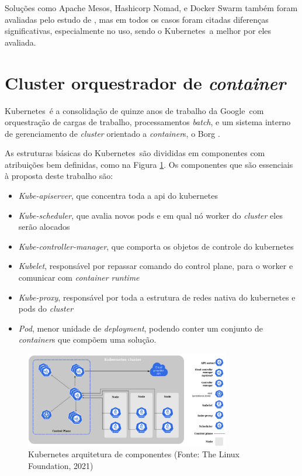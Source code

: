Soluções como Apache Mesos, Hashicorp Nomad, e Docker Swarm também foram avaliadas pelo estudo de \cite{truyen_comprehensive_2021}, mas em todos os casos foram citadas diferenças significativas, especialmente no uso, sendo o Kubernetes\textregistered \ a melhor por eles avaliada. 

\section{Cluster orquestrador de \emph{container}}

Kubernetes\textregistered \ é a consolidação de quinze anos de trabalho da Google\textregistered \ com orquestração de cargas de trabalho, processamentos \emph{batch}, e um sistema interno de gerenciamento de \emph{cluster} orientado a \emph{container}s, o Borg \cite{verma_large-scale_2015}. 

As estruturas básicas do Kubernetes\textregistered \ são divididas em componentes com atribuições bem definidas, como na Figura \ref{fig:kubenode}. Os componentes que são essenciais à proposta deste trabalho são:
\begin{itemize}
    \item \emph{Kube-apiserver}, que concentra toda a api do kubernetes
    \item \emph{Kube-scheduler}, que avalia novos pods e em qual nó worker do \emph{cluster} eles serão alocados
    \item \emph{Kube-controller-manager}, que comporta os objetos de controle do kubernetes
    \item \emph{Kubelet}, responsável por repassar comando do control plane, para o worker e comunicar com \emph{container} \emph{runtime}
    \item \emph{Kube-proxy}, responsável por toda a estrutura de redes nativa do kubernetes e pods do \emph{cluster}
    \item \emph{Pod}, menor unidade de \emph{deployment}, podendo conter um conjunto de \emph{container}s que compõem uma solução.
\end{itemize}

\begin{figure}[!h]
    \centering
    \includegraphics[width=0.8\textwidth]{04-figuras/kubeadm-node.png}
    \caption[Kubernetes arquitetura de componentes ]{Kubernetes arquitetura de componentes (Fonte: The Linux Foundation\textregistered, 2021)}
    \label{fig:kubenode}
\end{figure}



